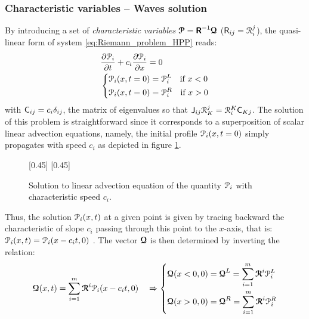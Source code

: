 \subsubsection*{Characteristic variables -- Waves solution}
By introducing a set of \textit{characteristic variables} ${\boldsymbol{\mathcal{P}}}=\boldsymbol{\mathsf{R}}^{-1}{\boldsymbol{\mathcal{Q}}}$ ($\mathsf{R}_{ij}=\mathcal{R}^j_i$), the quasi-linear form of system \eqref{eq:Riemann_problem_HPP} reads:
\begin{equation}
  \label{eq:RP_characteristic_variables}
  \begin{aligned}
    &\frac{\partial \mathcal{P}_i}{\partial t} + c_i\frac{\partial \mathcal{P}_i}{\partial x} = 0 \\
    &\left\lbrace 
      \begin{aligned}
        & \mathcal{P}_i(x,t=0) = \mathcal{P}_i^L \quad \text{if } x< 0\\
        & \mathcal{P}_i(x,t=0) = \mathcal{P}_i^R \quad \text{if } x> 0
      \end{aligned}
    \right.
  \end{aligned}
\end{equation}
with $\mathsf{C}_{ij}=c_i\delta_{ij}$, the matrix of eigenvalues so that $\mathsf{J}_{ij} \mathcal{R}^j_K = \mathcal{R}^K_i\mathsf{C}_{Kj}$. The solution of this problem is straightforward since it corresponds to a superposition of scalar linear advection equations, namely, the initial profile $\mathcal{P}_i(x,t=0)$ simply propagates with speed $c_i$ as depicted in figure \ref{fig:advection}.  
\begin{figure}[h!]
  \centering
  \subcaptionbox*{}[0.45\linewidth]{}
  \subcaptionbox*{}[0.45\linewidth]{}
  \caption{Solution to linear advection equation of the quantity $\mathcal{P}_i$ with characteristic speed $c_i$.}
  \label{fig:advection}
\end{figure}
Thus, the solution  $\mathcal{P}_i(x,t)$ at a given point is given by tracing backward the characteristic of slope $c_i$ passing through this point to the $x$-axis, that is: $\mathcal{P}_i(x,t)=\mathcal{P}_i(x-c_it,0)$  \cite[p.52]{Toro}. The vector ${\boldsymbol{\mathcal{Q}}}$ is then determined by inverting the relation:
\begin{equation}
  \label{eq:Q_expansion}
  {\boldsymbol{\mathcal{Q}}}(x,t) = \sum_{i=1}^m {\boldsymbol{\mathcal{R}}}^i \mathcal{P}_i(x-c_it,0) \quad \Rightarrow
  \left\lbrace
    \begin{aligned}
      & {\boldsymbol{\mathcal{Q}}}(x<0,0)={\boldsymbol{\mathcal{Q}}}^L=\sum_{i=1}^{m}{\boldsymbol{\mathcal{R}}}^i \mathcal{P}_i^L\\
      & {\boldsymbol{\mathcal{Q}}}(x>0,0)={\boldsymbol{\mathcal{Q}}}^R= \sum_{i=1}^{m}{\boldsymbol{\mathcal{R}}}^i \mathcal{P}_i^R
    \end{aligned}
    \right.
\end{equation}
